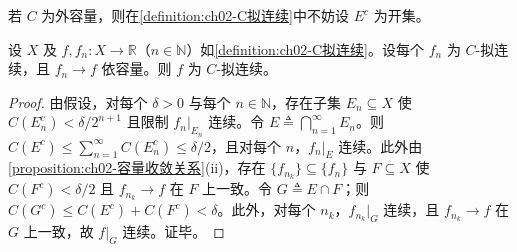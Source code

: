 \documentclass[../../main.tex]{subfiles}%
\begin{document}
\begin{remark}\label{remark:ch02-外容量开集}
若 $C$ 为外容量，则在\cref{definition:ch02-C拟连续}中不妨设 $E^c$ 为开集。
\end{remark}

\begin{proposition}\label{proposition:ch02-容量拟连续闭}
设 $X$ 及 $f,f_n:X\to\mathbb R$（$n\in\mathbb N$）如\cref{definition:ch02-C拟连续}。设每个 $f_n$ 为 $C$-拟连续，且 $f_n\to f$ 依容量。则 $f$ 为 $C$-拟连续。
\end{proposition}

\begin{proof}
由假设，对每个 $\delta>0$ 与每个 $n\in\mathbb N$，存在子集 $E_n\subseteq X$ 使 $C(E_n^c)<\delta/2^{n+1}$ 且限制 $f_n|_{E_n}$ 连续。令 $E\triangleq \bigcap_{n=1}^\infty E_n$。则 $C(E^c)\leqslant\sum_{n=1}^\infty C(E_n^c)\leqslant\delta/2$，且对每个 $n$，$f_n|_E$ 连续。此外由\cref{proposition:ch02-容量收敛关系}(ii)，存在 $\{f_{n_k}\}\subseteq\{f_n\}$ 与 $F\subseteq X$ 使 $C(F^c)<\delta/2$ 且 $f_{n_k}\to f$ 在 $F$ 上一致。令 $G\triangleq E\cap F$；则 $C(G^c)\leqslant C(E^c)+C(F^c)<\delta$。此外，对每个 $n_k$，$f_{n_k}|_G$ 连续，且 $f_{n_k}\to f$ 在 $G$ 上一致，故 $f|_G$ 连续。证毕。
\end{proof}
\end{document}
